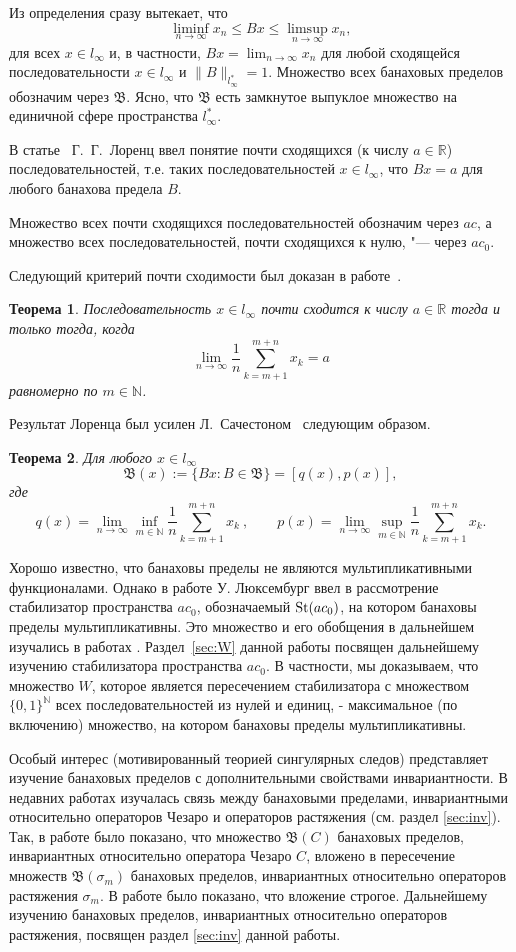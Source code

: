 \documentclass[12pt]{article}
\newtheorem{thm}{Теорема}
\def\N{{\mathbb{N}}}
\begin{document}
Из определения сразу вытекает, что
$$\liminf_{n\to\infty}x_n \le Bx \le \limsup_{n\to\infty}x_n,$$
для всех $x\in l_\infty$ и, в частности,
 $\displaystyle
Bx=\lim_{n\to\infty}x_n$ для любой сходящейся
последовательности $x\in l_\infty$ и $\|B\|_{l_\infty^*}=1$. Множество всех банаховых пределов обозначим
 через $\mathfrak{B}$. Ясно, что $\mathfrak{B}$ есть замкнутое выпуклое
множество на единичной сфере пространства $l_\infty^*$.

В статье~\cite{L} Г.~Г.~Лоренц ввел понятие почти сходящихся (к числу $a\in \mathbb R$) последовательностей, т.е. таких последовательностей $x\in l_\infty$, что $Bx=a$ для любого банахова предела $B$.

Множество всех почти сходящихся последовательностей обозначим через $ac$,
а множество всех последовательностей, почти сходящихся к нулю, "--- через $ac_0$.

Следующий критерий почти сходимости был доказан в работе~\cite{L}.
\begin{thm}\label{lorentz}
Последовательность $x\in l_\infty$ почти сходится к числу $a\in \mathbb R$ тогда и только тогда, когда
$$
 \lim_{n\to\infty}\frac1n\sum_{k=m+1}^{m+n}x_k=a
$$
равномерно по $m\in{\mathbb N}$.
\end{thm}

Результат Лоренца был усилен Л.~Сачестоном~\cite{S} следующим образом.
\begin{thm}\label{sucheston}
Для любого $x\in l_\infty$
$$\mathfrak B (x):=\{Bx: B\in \mathfrak B\}=[q(x),p(x)],$$
где
$$
 q(x)=\lim_{n\to\infty}\inf_{m\in\mathbb N}
  \frac1n \sum_{k=m+1}^{m+n} x_k \ ,
\qquad
 p(x)=\lim_{n\to\infty}\sup_{m\in\mathbb N}
  \frac1n \sum_{k=m+1}^{m+n} x_k.
$$
\end{thm}

Хорошо известно, что банаховы пределы не являются мультипликативными функционалами. Однако в работе \cite{Luxemburg} У. Люксембург ввел в рассмотрение стабилизатор пространства $ac_0$, обозначаемый ${\rm St}(ac_0)$, на котором банаховы пределы мультипликативны. Это множество и его обобщения в дальнейшем изучались в работах \cite{Alekhno, SSU2, ASSU4}. Раздел~\ref{sec:W} данной работы посвящен дальнейшему изучению стабилизатора пространства $ac_0$. В частности, мы доказываем, что множество $W$, которое является пересечением стабилизатора с множеством $\{0,1\}^\N$ всех последовательностей из нулей и единиц, - максимальное (по включению) множество, на котором банаховы пределы мультипликативны.

Особый интерес (мотивированный теорией сингулярных следов) представляет изучение банаховых пределов с дополнительными свойствами инвариантности. В недавних работах изучалась связь между банаховыми пределами, инвариантными относительно операторов Чезаро и операторов растяжения (см. раздел \ref{sec:inv}). Так, в работе \cite{SSUZ2} было показано, что множество $\mathfrak{B}(C)$ банаховых пределов, инвариантных относительно оператора Чезаро $C$, вложено в пересечение множеств $\mathfrak{B}(\sigma_m)$ банаховых пределов, инвариантных относительно операторов растяжения $\sigma_m$. В работе \cite{SSUZ3} было показано, что вложение строгое. Дальнейшему изучению банаховых пределов, инвариантных относительно операторов растяжения, посвящен раздел \ref{sec:inv} данной работы.
\end{document}
